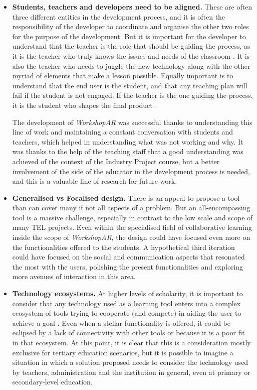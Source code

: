 \begin{itemize}
    \item \textbf{Students, teachers and developers need to be aligned.} These are often three different entities in the development process, and it is often the responsibility of the
    developer to coordinate and organise the other two roles for the purpose of the development. But it is important for the developer to understand that the teacher is the role that
    should be guiding the process, as it is the teacher who truly knows the issues and needs of the classroom \parencite{schmitz_2023,gupta_2022}. It is also the teacher who needs to
    juggle the new technology along with the other myriad of elements that make a lesson possible. Equally important is to understand that the end user is the student, and that any
    teaching plan will fail if the student is not engaged. If the teacher is the one guiding the process, it is the student who shapes the final product \parencite{vahedi_2021,ubaidillah_2020}.
    
    The development of \emph{WorkshopAR} was successful thanks to understanding this line of work and maintaining a constant conversation with students and teachers, which helped in
    understanding what was not working and why. It was thanks to the help of the teaching staff that a good understanding was achieved of the context of the Industry Project course, but a
    better involvement of the side of the educator in the development process is needed, and this is a valuable line of research for future work.
    \item \textbf{Generalised vs Focalised design.} There is an appeal to propose a tool than can cover many if not all aspects of a problem. But an all-encompassing tool is a massive
    challenge, especially in contrast to the low scale and scope of many \ac{TEL} projects. Even within the specialised field of collaborative learning inside the scope of \emph{WorkshopAR},
    the design could have focused even more on the functionalities offered to the students. A hypothetical third iteration could have focused on the social and communication aspects that
    resonated the most with the users, polishing the present functionalities and exploring more avenues of interaction in this area.
    \item \textbf{Technology ecosystems.} At higher levels of scholarity, it is important to consider that any technology used as a learning tool enters into a complex ecosystem of tools
    trying to cooperate (and compete) in aiding the user to achieve a goal \parencite{omirzak_2022,alam_2023}. Even when a stellar functionality is offered, it could be eclipsed by a lack
    of connectivity with other tools or because it is a poor fit in that ecosystem. At this point, it is clear that this is a consideration mostly exclusive for tertiary education scenarios,
    but it is possible to imagine a situation in which a solution proposed needs to consider the technology used by teachers, administration and the institution in general, even at primary
    or secondary-level education.
\end{itemize}

